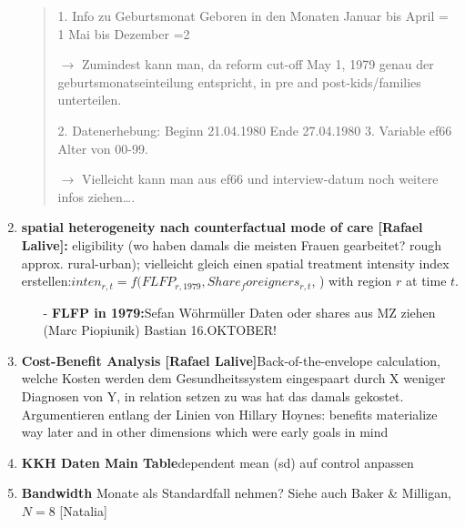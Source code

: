 \documentclass[11pt,a4paper]{article}
\begin{document}
\begin{enumerate}
\begin{quote}
1.	Info zu Geburtsmonat   Geboren in den Monaten
Januar bis April = 1
Mai bis Dezember  =2 

$\rightarrow$	Zumindest kann man, da reform cut-off May 1, 1979 genau der geburtsmonatseinteilung entspricht, in pre and post-kids/families unterteilen.

2.	Datenerhebung: 
Beginn 21.04.1980 
Ende 27.04.1980 
3. Variable ef66 Alter von 00-99.

$\rightarrow$	Vielleicht kann man aus ef66 und interview-datum noch weitere infos ziehen….
\end{quote}


\item  \textbf{spatial heterogeneity nach counterfactual mode of care [Rafael Lalive]:} \newline eligibility (wo haben damals die meisten Frauen gearbeitet? rough approx. rural-urban); vielleicht gleich einen spatial treatment intensity index erstellen:\newline $inten_{r,t}=f(FLFP_{r,1979}, Share_foreigners_{r,t}$, ) \newline
with region $r$ at time $t$. 
\begin{itemize}
\item[-] \textbf{FLFP in 1979:}\newline Sefan Wöhrmüller Daten oder shares aus MZ ziehen (Marc Piopiunik) Bastian 16.OKTOBER!
\end{itemize}


\item \textbf{Cost-Benefit Analysis [Rafael Lalive]}\newline Back-of-the-envelope calculation, welche Kosten werden dem Gesundheitssystem eingespaart durch X weniger Diagnosen von Y, in relation setzen zu was hat das damals gekostet. Argumentieren entlang der Linien von Hillary Hoynes: benefits materialize way later and in other dimensions which were early goals in mind

\item \textbf{KKH Daten Main Table}\newline dependent mean (sd) auf control anpassen

\item \textbf{Bandwidth} Monate als Standardfall nehmen? \newline
Siehe auch Baker \& Milligan, $N=8$ [Natalia]


\end{enumerate}
\end{document}
